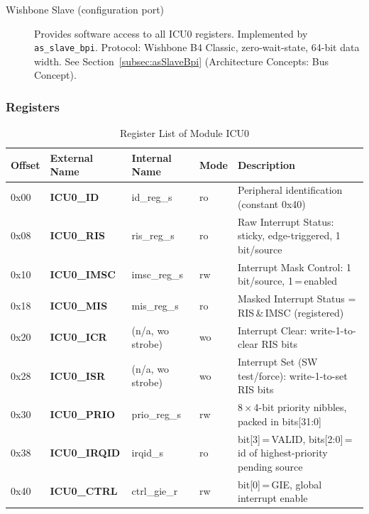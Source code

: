 \begin{description}
  \item[Wishbone Slave (configuration port)] Provides software access to
    all ICU0 registers. Implemented by \texttt{as\_slave\_bpi}.
    Protocol: Wishbone B4 Classic, zero-wait-state, 64-bit data width.
    See Section~\ref{subsec:asSlaveBpi} (Architecture Concepts: Bus Concept).
\end{description}

\subsubsection{Registers}

\begin{table}[H]
\caption{Register List of Module ICU0}
\label{tab:asIcuPer03}
\centering
\begin{tabularx}{\textwidth}{|l |l |l |l |X|}
  \hline
  Offset & External Name & Internal Name & Mode & Description \\
  \hline
  \hline
  0x00 & \textbf{ICU0\_ID}    & id\_reg\_s     & ro & Peripheral identification (constant 0x40) \\
  \hline
  0x08 & \textbf{ICU0\_RIS}   & ris\_reg\_s    & ro & Raw Interrupt Status: sticky, edge-triggered, 1 bit/source \\
  \hline
  0x10 & \textbf{ICU0\_IMSC}  & imsc\_reg\_s   & rw & Interrupt Mask Control: 1 bit/source, 1\,=\,enabled \\
  \hline
  0x18 & \textbf{ICU0\_MIS}   & mis\_reg\_s    & ro & Masked Interrupt Status = RIS\,\&\,IMSC (registered) \\
  \hline
  0x20 & \textbf{ICU0\_ICR}   & (n/a, wo strobe) & wo & Interrupt Clear: write-1-to-clear RIS bits \\
  \hline
  0x28 & \textbf{ICU0\_ISR}   & (n/a, wo strobe) & wo & Interrupt Set (SW test/force): write-1-to-set RIS bits \\
  \hline
  0x30 & \textbf{ICU0\_PRIO}  & prio\_reg\_s   & rw & 8\,$\times$\,4-bit priority nibbles, packed in bits[31:0] \\
  \hline
  0x38 & \textbf{ICU0\_IRQID} & irqid\_s       & ro & bit[3]\,=\,VALID, bits[2:0]\,=\,id of highest-priority pending source \\
  \hline
  0x40 & \textbf{ICU0\_CTRL}  & ctrl\_gie\_r   & rw & bit[0]\,=\,GIE, global interrupt enable \\
  \hline
\end{tabularx}
\end{table}

